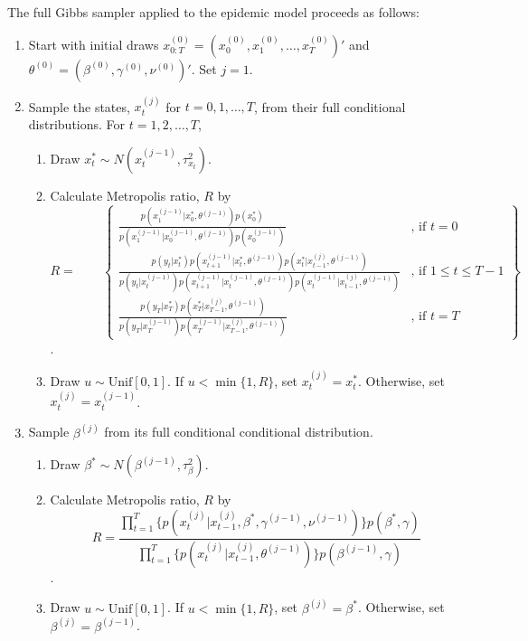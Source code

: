 The full Gibbs sampler applied to the epidemic model proceeds as follows:
\begin{enumerate}
\item Start with initial draws $x^{(0)}_{0:T} = (x^{(0)}_0, x^{(0)}_1, \ldots, x^{(0)}_T)'$ and $\theta^{(0)} = (\beta^{(0)}, \gamma^{(0)}, \nu^{(0)})'$. Set $j = 1$.
\item \label{step:gibbs} Sample the states, $x^{(j)}_t$ for $t = 0,1,\ldots,T$, from their full conditional distributions. For $t = 1, 2, \ldots, T$,
    \begin{enumerate}[label=\alph*.,leftmargin=1.75\parindent]
    \item Draw $x^*_t \sim N(x^{(j-1)}_t,\tau^2_{x_t})$.
    \item Calculate Metropolis ratio, $R$ by
    \[R = \qquad \left\{
    \begin{array}{cc}
    \frac{p(x^{(j-1)}_1|x^*_0,\theta^{(j-1)})p(x^*_0)}{p(x^{(j-1)}_1|x^{(j-1)}_0,\theta^{(j-1)})p(x^{(j-1)}_0)} & \mbox{, if } t = 0 \\
    \frac{p(y_t|x^*_t)p(x^{(j-1)}_{t+1}|x^*_t,\theta^{(j-1)})p(x^*_t|x^{(j)}_{t-1},\theta^{(j-1)})}{p(y_t|x^{(j-1)}_t)p(x^{(j-1)}_{t+1}|x^{(j-1)}_t,\theta^{(j-1)})p(x^{(j-1)}_t|x^{(j)}_{t-1},\theta^{(j-1)})} & \mbox{, if } 1 \le t \le T-1 \\
        \frac{p(y_T|x^*_T)p(x^*_T|x^{(j)}_{T-1},\theta^{(j-1)})}{p(y_T|x^{(j-1)}_T)p(x^{(j-1)}_T|x^{(j)}_{T-1},\theta^{(j-1)})}  & \mbox{, if } t = T
    \end{array}
    \right\}\].
    \item Draw $u \sim \mbox{Unif}[0,1]$. If $u < \min\{1, R\}$, set $x^{(j)}_t = x^*_t$. Otherwise, set $x^{(j)}_t = x^{(j-1)}_t$.
    \end{enumerate}
\item \label{step:beta} Sample $\beta^{(j)}$ from its full conditional conditional distribution.
    \begin{enumerate}[label=\alph*.,leftmargin=1.75\parindent]
    \item Draw $\beta^* \sim N(\beta^{(j-1)},\tau^2_{\beta})$.
    \item Calculate Metropolis ratio, $R$ by
    \[R = \frac{\prod_{t=1}^T \{p(x^{(j)}_t|x^{(j)}_{t-1},\beta^*,\gamma^{(j-1)},\nu^{(j-1)})\}p(\beta^*,\gamma)}{\prod_{t=1}^T \{p(x^{(j)}_t|x^{(j)}_{t-1},\theta^{(j-1)})\}p(\beta^{(j-1)},\gamma)}\].
    \item Draw $u \sim \mbox{Unif}[0,1]$. If $u < \min\{1, R\}$, set $\beta^{(j)} = \beta^*$. Otherwise, set $\beta^{(j)} = \beta^{(j-1)}$.

\end{enumerate}
\end{enumerate}
